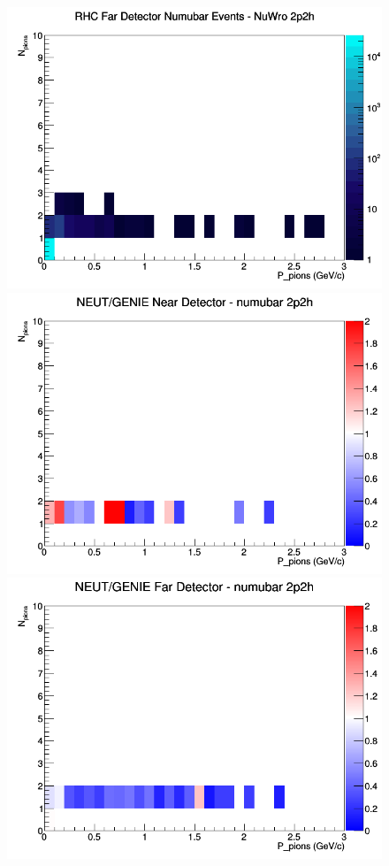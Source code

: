 \documentclass[12pt]{article}
\begin{document}
\begin{figure}[h]
\endminipage
{}
\includegraphics[width=\linewidth]{N_P/nominal/pions/2p2h_RHC_FD_numubar_N_P_NuWro.png}
\endminipage
\newline
{}
\includegraphics[width=\linewidth]{N_P/nominal/pions/ratios/2p2h_NEUT_GENIE_numubar_near_N_P.png}
\endminipage
{}
\includegraphics[width=\linewidth]{N_P/nominal/pions/ratios/2p2h_NEUT_GENIE_numubar_far_N_P.png}

\end{figure}
\end{document}
